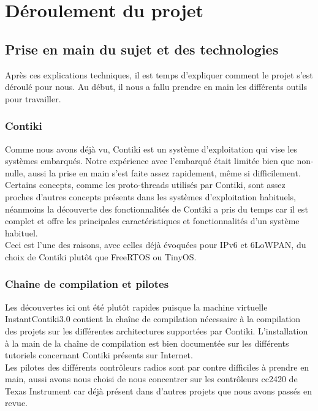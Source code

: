 \chapter{Déroulement du projet}
\label{sec:deroulement}

\section{Prise en main du sujet et des technologies}
	Après ces explications techniques, il est temps d'expliquer comment le projet s'est déroulé pour nous. Au début, il nous a fallu prendre en main les différents outils pour travailler.
	
	\subsection{Contiki}
	Comme nous avons déjà vu, Contiki est un système d'exploitation qui vise les systèmes embarqués. Notre expérience avec l'embarqué était limitée bien que non-nulle, aussi la prise en main s'est faite assez rapidement, même si difficilement.\\
	Certains concepts, comme les proto-threads utilisés par Contiki, sont assez proches d'autres concepts présents dans les systèmes d'exploitation habituels, néanmoins la découverte des fonctionnalités de Contiki a pris du temps car il est complet et offre les principales caractéristiques et fonctionnalités d'un système habituel.\\
	Ceci est l'une des raisons, avec celles déjà évoquées pour IPv6 et 6LoWPAN, du choix de Contiki plutôt que FreeRTOS ou TinyOS.

	\subsection{Chaîne de compilation et pilotes}
	Les découvertes ici ont été plutôt rapides puisque la machine virtuelle InstantContiki3.0 contient la chaîne de compilation nécessaire à la compilation des projets sur les différentes architectures supportées par Contiki. L'installation à la main de la chaîne de compilation est bien documentée sur les différents tutoriels concernant Contiki présents sur Internet.\\
	Les pilotes des différents contrôleurs radios sont par contre difficiles à prendre en main, aussi avons nous choisi de nous concentrer sur les contrôleurs cc2420 de Texas Instrument car déjà présent dans d'autres projets que nous avons passés en revue.

